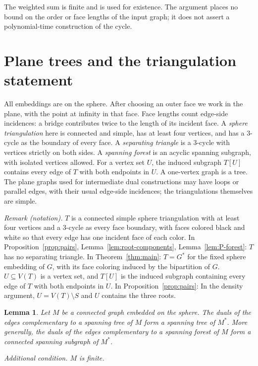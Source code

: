 \documentclass[11pt]{article}
\newtheorem{lemma}[theorem]{Lemma}
\theoremstyle{remark}
\numberwithin{equation}{section}
\begin{document}
The weighted sum is finite and is used for existence. The argument
places no bound on the order or face lengths of the input graph;
it does not assert a polynomial-time construction of the cycle.

\section{Plane trees and the triangulation statement}\label{sec:setup}

All embeddings are on the sphere. After choosing an outer face
we work in the plane, with the point at infinity in that face.
Face lengths count edge-side incidences: a bridge contributes
twice to the length of its incident face. A \emph{sphere
triangulation} here is connected and simple, has at least four
vertices, and has a \(3\)-cycle as the boundary of every face.
A \emph{separating triangle} is a \(3\)-cycle with vertices strictly
on both sides.
A \emph{spanning forest} is an acyclic spanning subgraph, with
isolated vertices allowed. For a vertex set \(U\), the induced subgraph
\(T[U]\) contains every edge of \(T\) with both endpoints in \(U\).
A one-vertex graph is a tree. The plane graphs used for intermediate
dual constructions may have loops or parallel edges, with their usual
edge-side incidences; the triangulations themselves are simple.

\noindent\textit{Remark (notation).} $T$ is a connected simple sphere triangulation with at least four vertices and a $3$-cycle as every face boundary, with faces colored black and white so that every edge has one incident face of each color. In Proposition~\ref{prop:pairs}, Lemma~\ref{lem:root-components}, Lemma~\ref{lem:P-forest}: $T$ has no separating triangle. In Theorem~\ref{thm:main}: $T=G^*$ for the fixed sphere embedding of $G$, with its face coloring induced by the bipartition of $G$. $U\subseteq V(T)$ is a vertex set, and $T[U]$ is the induced subgraph containing every edge of $T$ with both endpoints in $U$. In Proposition~\ref{prop:pairs}: In the density argument, $U=V(T)\setminus S$ and $U$ contains the three roots.


\begin{lemma}\label{lem:duality}
Let \(M\) be a connected graph embedded on the sphere.
The duals of the edges complementary to a spanning tree of \(M\)
form a spanning tree of \(M^*\). More generally, the duals of the
edges complementary to a spanning forest of \(M\) form a
connected spanning subgraph of \(M^*\).

\emph{Additional condition.} $M$ is finite.
\end{lemma}
\end{document}
